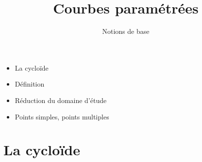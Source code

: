 


   





\title{{\bf Courbes paramétrées}}
\subtitle{Notions de base}

\begin{frame}
  
  \debutmontitre

  \pause

{\footnotesize
\hfill
{}
\begin{minipage}{0.6\textwidth}
  \begin{itemize}
    \item<3-> La cycloïde
    \item<4-> Définition
    \item<5-> Réduction du domaine d'étude
    \item<6-> Points simples, points multiples   
  \end{itemize}
\end{minipage}
}

\end{frame}

\setcounter{framenumber}{0}



\section{La cycloïde}

\begin{frame}



\end{frame}


\begin{frame}

\end{frame}



